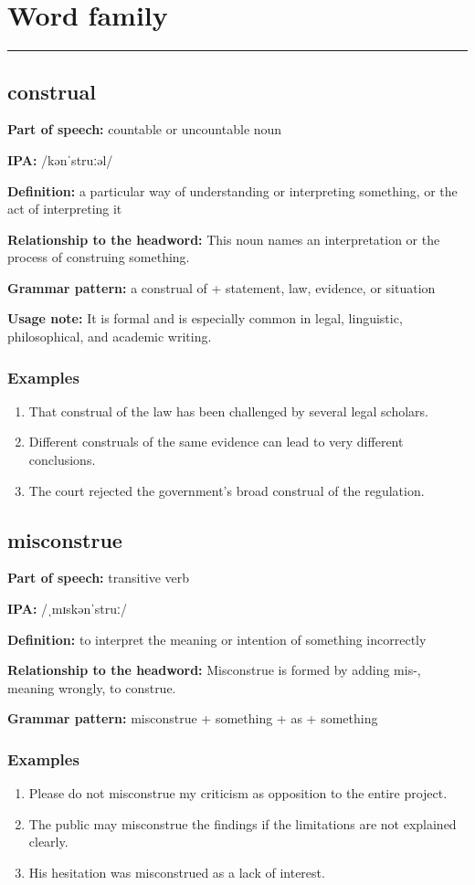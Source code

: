 \documentclass[11pt]{article}
\newcommand{\sectionrule}{\par\vspace{-0.5em}\noindent\textcolor{Accent}{\rule{\linewidth}{0.6pt}}\par}
\begin{document}
\section{Word family}
\sectionrule
\subsection{construal}
\textbf{Part of speech:} countable or uncountable noun

\textbf{IPA:} /kənˈstruːəl/

\textbf{Definition:} a particular way of understanding or interpreting something, or the act of interpreting it

\textbf{Relationship to the headword:} This noun names an interpretation or the process of construing something.

\textbf{Grammar pattern:} a construal of + statement, law, evidence, or situation

\textbf{Usage note:} It is formal and is especially common in legal, linguistic, philosophical, and academic writing.

\subsubsection{Examples}
\begin{enumerate}
  \item That construal of the law has been challenged by several legal scholars.
  \item Different construals of the same evidence can lead to very different conclusions.
  \item The court rejected the government's broad construal of the regulation.
\end{enumerate}

\subsection{misconstrue}
\textbf{Part of speech:} transitive verb

\textbf{IPA:} /ˌmɪskənˈstruː/

\textbf{Definition:} to interpret the meaning or intention of something incorrectly

\textbf{Relationship to the headword:} Misconstrue is formed by adding mis-, meaning wrongly, to construe.

\textbf{Grammar pattern:} misconstrue + something + as + something

\subsubsection{Examples}
\begin{enumerate}
  \item Please do not misconstrue my criticism as opposition to the entire project.
  \item The public may misconstrue the findings if the limitations are not explained clearly.
  \item His hesitation was misconstrued as a lack of interest.
\end{enumerate}
\end{document}
